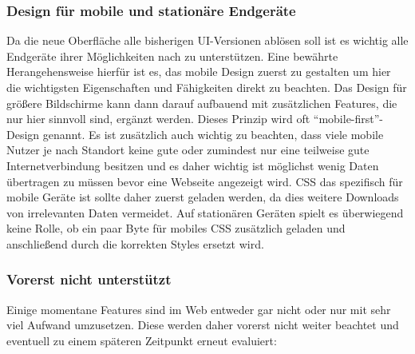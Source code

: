 \subsubsection{Design für mobile und stationäre Endgeräte}
Da die neue Oberfläche alle bisherigen UI-Versionen ablösen soll ist es wichtig alle Endgeräte ihrer Möglichkeiten nach zu unterstützen. Eine bewährte Herangehensweise hierfür ist es, das mobile Design zuerst zu gestalten um hier die wichtigsten Eigenschaften und Fähigkeiten direkt zu beachten. Das Design für größere Bildschirme kann dann darauf aufbauend mit zusätzlichen Features, die nur hier sinnvoll sind, ergänzt werden. Dieses Prinzip wird oft ``mobile-first''-Design genannt.
Es ist zusätzlich auch wichtig zu beachten, dass viele mobile Nutzer je nach Standort keine gute oder zumindest nur eine teilweise gute Internetverbindung besitzen und es daher wichtig ist möglichst wenig Daten übertragen zu müssen bevor eine Webseite angezeigt wird. CSS das spezifisch für mobile Geräte ist sollte daher zuerst geladen werden, da dies weitere Downloads von irrelevanten Daten vermeidet. Auf stationären Geräten spielt es überwiegend keine Rolle, ob ein paar Byte für mobiles CSS zusätzlich geladen und anschließend durch die korrekten Styles ersetzt wird.

\subsubsection{Vorerst nicht unterstützt}
Einige momentane Features sind im Web entweder gar nicht oder nur mit sehr viel Aufwand umzusetzen. Diese werden daher vorerst nicht weiter beachtet und eventuell zu einem späteren Zeitpunkt erneut evaluiert:

